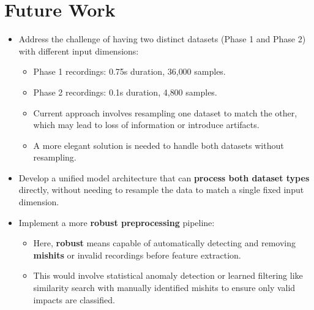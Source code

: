 \documentclass{article}
\begin{document}
\section{Future Work}
\begin{itemize}
    \item Address the challenge of having two distinct datasets (Phase 1 and Phase 2) with different input dimensions:
        \begin{itemize}
            \item Phase 1 recordings: 0.75s duration, 36{,}000 samples.
            \item Phase 2 recordings: 0.1s duration, 4{,}800 samples.
        \end{itemize}
        \begin{itemize}
            \item Current approach involves resampling one dataset to match the other, which may lead to loss of information or introduce artifacts.
            \item A more elegant solution is needed to handle both datasets without resampling.
        \end{itemize}
    \item Develop a unified model architecture that can \textbf{process both dataset types} directly, without needing to resample the data to match a single fixed input dimension.
    \item Implement a more \textbf{robust preprocessing} pipeline:
        \begin{itemize}
            \item Here, \textbf{robust} means capable of automatically detecting and removing \textbf{mishits} or invalid recordings before feature extraction.
            \item This would involve statistical anomaly detection or learned filtering like similarity search with manually identified mishits to ensure only valid impacts are classified.
        \end{itemize}
\end{itemize}
\end{document}
